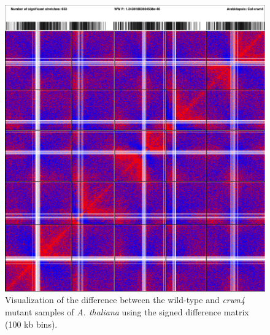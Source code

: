 \documentclass[a4paper,10pt]{article}
\begin{document}
\clearpage
\begin{figure}[!ht]
\begin{center}
\centering
\includegraphics[width=5in]{sdmDiff_Col_crwn4.png}
\end{center}
\caption{Visualization of the difference between the wild-type and \textit{crwn4} mutant samples of \textit{A. thaliana} \cite{2014_Grob} using the signed difference matrix (100 kb bins).}
\label{sdmDiff}
\end{figure}
\clearpage
\end{document}
